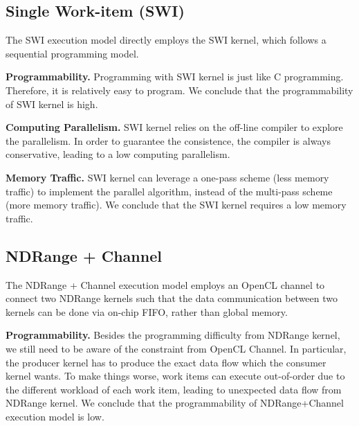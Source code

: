 \vspace{-1ex}
\subsection{Single Work-item (SWI)}
\label{subsec_swi} 
The SWI execution model directly employs the SWI kernel, which follows a sequential programming model. %


{\bf Programmability. }Programming with SWI kernel is just like C programming. Therefore, it is relatively easy to program. We conclude that the programmability of SWI kernel is high.

{\bf Computing Parallelism. }SWI kernel relies on the off-line compiler to explore the parallelism. In order to guarantee the consistence, the compiler is always conservative, leading to a low computing parallelism.  

{\bf Memory Traffic. }SWI kernel can leverage a one-pass scheme (less memory traffic) to implement the parallel algorithm, instead of the multi-pass scheme (more memory traffic). We conclude that the SWI kernel requires a low memory traffic. 


\vspace{-1ex}
\subsection{NDRange + Channel}
The NDRange + Channel execution model employs an OpenCL channel to connect two NDRange kernels such that the data communication between two kernels can be done via on-chip FIFO, rather than global memory. 

{\bf Programmability. }Besides the programming difficulty from NDRange kernel, we still need to be aware of the constraint from OpenCL Channel. In particular, the producer kernel has to produce the exact data flow which the consumer kernel wants. To make things worse, work items can execute out-of-order due to the different workload of each work item, leading to unexpected data flow from NDRange kernel. We conclude that the programmability of NDRange+Channel execution model is low.


